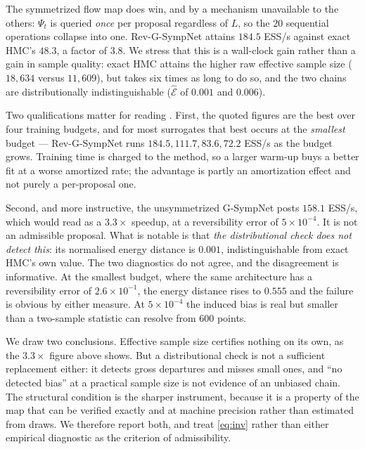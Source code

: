 \documentclass{article}
\theoremstyle{plain}
\theoremstyle{definition}
\theoremstyle{remark}
\begin{document}
The symmetrized flow map does win, and by a mechanism unavailable to the others:
$\Psi_t$ is queried \emph{once} per proposal regardless of $L$, so the $20$
sequential operations collapse into one. Rev-G-SympNet attains $184.5$ ESS/s
against exact HMC's $48.3$, a factor of $3.8$. We stress that this is a
wall-clock gain rather than a gain in sample quality: exact HMC attains the
higher raw effective sample size ($18{,}634$ versus $11{,}609$), but takes six
times as long to do so, and the two chains are distributionally
indistinguishable ($\widehat{\mathcal{E}}$ of $0.001$ and $0.006$).

Two qualifications matter for reading . First, the quoted figures
are the best over four training budgets, and for most surrogates that best
occurs at the \emph{smallest} budget --- Rev-G-SympNet runs $184.5, 111.7,
83.6, 72.2$ ESS/s as the budget grows. Training time is charged to the method,
so a larger warm-up buys a better fit at a worse amortized rate; the advantage
is partly an amortization effect and not purely a per-proposal one.

Second, and more instructive, the unsymmetrized G-SympNet posts $158.1$ ESS/s,
which would read as a $3.3\times$ speedup, at a reversibility error of
$5\times10^{-4}$. It is not an admissible proposal. What is notable is that
\emph{the distributional check does not detect this}: its normalised energy
distance is $0.001$, indistinguishable from exact HMC's own value. The two
diagnostics do not agree, and the disagreement is informative. At the smallest
budget, where the same architecture has a reversibility error of
$2.6\times10^{-1}$, the energy distance rises to $0.555$ and the failure is
obvious by either measure. At $5\times10^{-4}$ the induced bias is real but
smaller than a two-sample statistic can resolve from $600$ points.

We draw two conclusions. Effective sample size certifies nothing on its own, as
the $3.3\times$ figure above shows. But a distributional check is not a
sufficient replacement either: it detects gross departures and misses small
ones, and ``no detected bias'' at a practical sample size is not evidence of an
unbiased chain. The structural condition is the sharper instrument, because it
is a property of the map that can be verified exactly and at machine precision
rather than estimated from draws. We therefore report both, and treat
\eqref{eq:inv} rather than either empirical diagnostic as the criterion of
admissibility.
\end{document}
